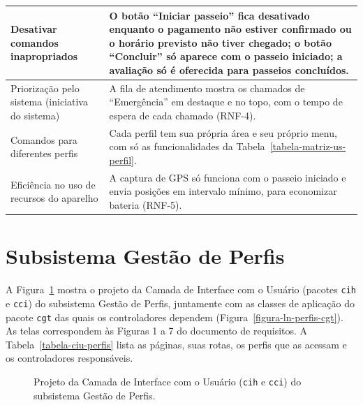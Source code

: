 \begin{footnotesize}
\begin{longtable}{|p{4.2cm}|p{10.2cm}|}
	Desativar comandos inapropriados & O botão ``Iniciar passeio'' fica desativado enquanto o pagamento não estiver confirmado ou o horário previsto não tiver chegado; o botão ``Concluir'' só aparece com o passeio iniciado; a avaliação só é oferecida para passeios concluídos. \\\hline
	Priorização pelo sistema (iniciativa do sistema) & A fila de atendimento mostra os chamados de ``Emergência'' em destaque e no topo, com o tempo de espera de cada chamado (RNF-4). \\\hline
	Comandos para diferentes perfis & Cada perfil tem sua própria área e seu próprio menu, com só as funcionalidades da Tabela~\ref{tabela-matriz-us-perfil}. \\\hline
	Eficiência no uso de recursos do aparelho & A captura de GPS só funciona com o passeio iniciado e envia posições em intervalo mínimo, para economizar bateria (RNF-5). \\\hline
\end{longtable}
\end{footnotesize}





\FloatBarrier
\section{Subsistema Gestão de Perfis}
\label{sec-ihc-perfis}

A Figura~\ref{figura-ciu-perfis} mostra o projeto da Camada de Interface com o Usuário (pacotes \texttt{cih} e \texttt{cci}) do subsistema Gestão de Perfis, juntamente com as classes de aplicação do pacote \texttt{cgt} das quais os controladores dependem (Figura~\ref{figura-ln-perfis-cgt}). As telas correspondem às Figuras 1 a 7 do documento de requisitos. A Tabela~\ref{tabela-ciu-perfis} lista as páginas, suas rotas, os perfis que as acessam e os controladores responsáveis.

\begin{figure}[h]
	\centering
	\caption{Projeto da Camada de Interface com o Usuário (\texttt{cih} e \texttt{cci}) do subsistema Gestão de Perfis.}
	\label{figura-ciu-perfis}
\end{figure}

